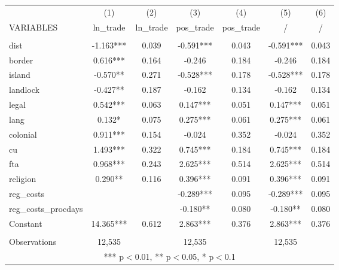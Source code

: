 \documentclass[]{article}
\begin{document}
\begin{tabular}{lcccccc} \hline
 & (1) & (2) & (3) & (4) & (5) & (6) \\
VARIABLES & ln\_trade & ln\_trade & pos\_trade & pos\_trade & / & / \\ \hline
 &  &  &  &  &  &  \\
dist & -1.163*** & 0.039 & -0.591*** & 0.043 & -0.591*** & 0.043 \\
border & 0.616*** & 0.164 & -0.246 & 0.184 & -0.246 & 0.184 \\
island & -0.570** & 0.271 & -0.528*** & 0.178 & -0.528*** & 0.178 \\
landlock & -0.427** & 0.187 & -0.162 & 0.134 & -0.162 & 0.134 \\
legal & 0.542*** & 0.063 & 0.147*** & 0.051 & 0.147*** & 0.051 \\
lang & 0.132* & 0.075 & 0.275*** & 0.061 & 0.275*** & 0.061 \\
colonial & 0.911*** & 0.154 & -0.024 & 0.352 & -0.024 & 0.352 \\
cu & 1.493*** & 0.322 & 0.745*** & 0.184 & 0.745*** & 0.184 \\
fta & 0.968*** & 0.243 & 2.625*** & 0.514 & 2.625*** & 0.514 \\
religion & 0.290** & 0.116 & 0.396*** & 0.091 & 0.396*** & 0.091 \\
reg\_costs &  &  & -0.289*** & 0.095 & -0.289*** & 0.095 \\
reg\_costs\_procdays &  &  & -0.180** & 0.080 & -0.180** & 0.080 \\
Constant & 14.365*** & 0.612 & 2.863*** & 0.376 & 2.863*** & 0.376 \\
 &  &  &  &  &  &  \\
 Observations & 12,535 &  & 12,535 &  & 12,535 &  \\ \hline
\multicolumn{7}{c}{ *** p$<$0.01, ** p$<$0.05, * p$<$0.1} \\
\end{tabular}
\end{document}
